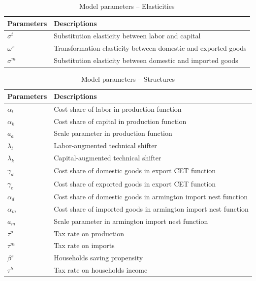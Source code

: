 \documentclass[12pt, a4paper]{article}
\numberwithin{equation}{section}
\numberwithin{figure}{section}
\numberwithin{table}{section}
\begin{document}
\begin{table}[htbp]
	\centering
	\caption{Model parameters -- Elasticities}
	\label{v2.0-model-parameters-elasticites}
	\small
	\begin{tabularx}{\linewidth}{@{} l X @{}}
		\toprule
		\textbf{Parameters} & \textbf{Descriptions} \\
		\midrule
		$\sigma^t$	& Substitution elasticity between labor and capital \\
		$\omega^x$	& Transformation elasticity between domestic and exported goods \\
		$\sigma^m$	& Substitution elasticity between domestic and imported goods \\
		\bottomrule
	\end{tabularx}
\end{table}

\begin{table}[htbp]
	\centering
	\caption{Model parameters -- Structures}
	\label{v2.0-model-parameters-structures}
	\small
	\begin{tabularx}{\linewidth}{@{} l X @{}}
		\toprule
		\textbf{Parameters} & \textbf{Descriptions} \\
		\midrule
		$\alpha_l$ 	& Cost share of labor in production function \\
		$\alpha_k$ 	& Cost share of capital in production function \\
		$a_a$        	& Scale parameter in production function \\
		$\lambda_l$	& Labor-augmented technical shifter \\
		$\lambda_k$ 	& Capital-augmented technical shifter \\
		$\gamma_d$ 	& Cost share of domestic goods in export CET function \\
		$\gamma_e$ 	& Cost share of exported goods in export CET function \\
		$\alpha_d$ 	& Cost share of domestic goods in armington import nest function \\
		$\alpha_m$ 	& Cost share of imported goods in armington import nest function \\
		$a_m$        	& Scale parameter in armington import nest function \\
		$\tau^p$	& Tax rate on production \\
		$\tau^m$	& Tax rate on imports \\
		$\beta^s$	& Households saving propensity \\
		$\tau^h$	& Tax rate on households income \\
		\bottomrule
	\end{tabularx}
\end{table}
\end{document}
